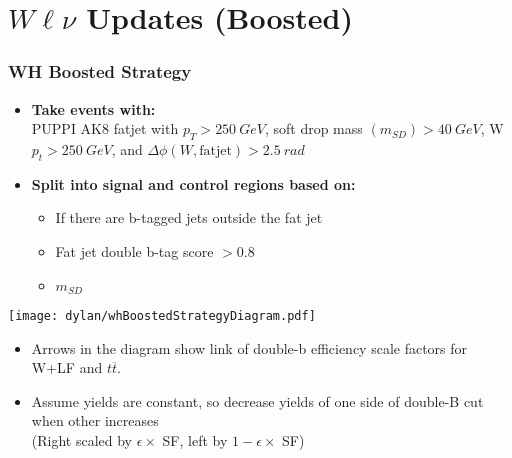 \documentclass{beamer}
\begin{document}
\section{$W\ell\nu$ Updates (Boosted)}

\begin{frame}
  \frametitle{WH Boosted Strategy}
      \begin{itemize}
      \item {\bf Take events with:} \\
        PUPPI AK8 fatjet with $p_T > \SI{250}{GeV}$,
        soft drop mass $(m_{SD}) > \SI{40}{GeV}$,
        W $p_t > \SI{250}{GeV}$, and
        $\Delta \phi(W, \mathrm{fatjet}) > \SI{2.5}{rad}$
      \item {\bf Split into signal and control regions based on:}
        \begin{itemize}
        \item If there are b-tagged jets outside the fat jet
        \item Fat jet double b-tag score $> 0.8$
        \item $m_{SD}$
        \end{itemize}
      \end{itemize}
\end{frame}

\begin{frame}
  \vspace{-60pt}
  \hspace*{0.1\linewidth}
  \texttt{[image: dylan/whBoostedStrategyDiagram.pdf]}
  \begin{itemize}
  \item Arrows in the diagram show link of double-b efficiency scale factors for W+LF and $t\overline{t}$.
  \item Assume yields are constant, so decrease yields of one side of double-B cut when other increases \\
    (Right scaled by $\epsilon \times $ SF, left by $1 - \epsilon \times $ SF)
  \end{itemize}
\end{frame}
\end{document}
